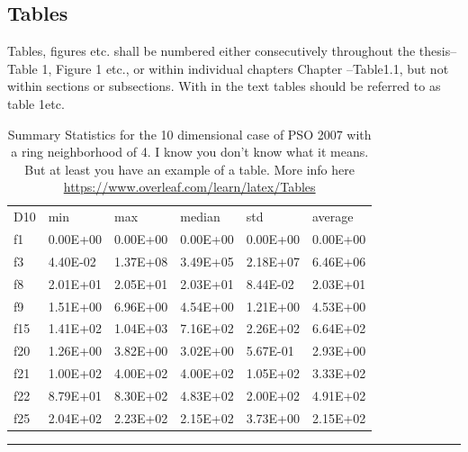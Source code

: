 \documentclass[../Thesis]{subfiles}
\begin{document}
\clearpage  %

\subsection{Tables}
Tables, figures etc. shall be numbered either consecutively throughout the thesis–Table 1, Figure 1 etc., or within individual chapters Chapter –Table1.1, but not within sections or subsections. With in the text tables should be referred to as table 1etc.

\begin{table}[H]
    \centering
        \begin{tabular}{llllll}
        D10 & min      & max      & median   & std      & average  \\
        f1  & 0.00E+00 & 0.00E+00 & 0.00E+00 & 0.00E+00 & 0.00E+00 \\
        f3  & 4.40E-02 & 1.37E+08 & 3.49E+05 & 2.18E+07 & 6.46E+06 \\
        f8  & 2.01E+01 & 2.05E+01 & 2.03E+01 & 8.44E-02 & 2.03E+01 \\
        f9  & 1.51E+00 & 6.96E+00 & 4.54E+00 & 1.21E+00 & 4.53E+00 \\
        f15 & 1.41E+02 & 1.04E+03 & 7.16E+02 & 2.26E+02 & 6.64E+02 \\
        f20 & 1.26E+00 & 3.82E+00 & 3.02E+00 & 5.67E-01 & 2.93E+00 \\
        f21 & 1.00E+02 & 4.00E+02 & 4.00E+02 & 1.05E+02 & 3.33E+02 \\
        f22 & 8.79E+01 & 8.30E+02 & 4.83E+02 & 2.00E+02 & 4.91E+02 \\
        f25 & 2.04E+02 & 2.23E+02 & 2.15E+02 & 3.73E+00 & 2.15E+02
        \end{tabular}
    \rule{35em}{0.5pt} 
    \caption[Example table]{Summary Statistics for the 10 dimensional case of PSO 2007 with a ring neighborhood of 4. I know you don't know what it means. But at least you have an example of a table. More info here \url{https://www.overleaf.com/learn/latex/Tables}}
    \label{tab:PSO_2007_D10_R4}
\end{table}
\end{document}
